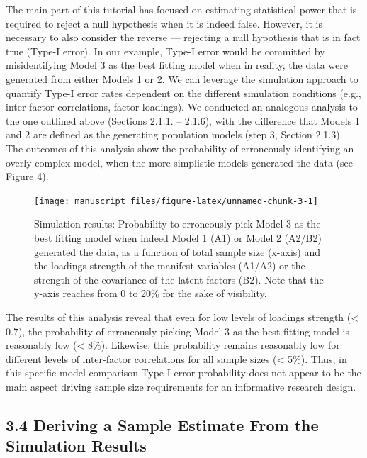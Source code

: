 \documentclass[
  man,floatsintext]{apa6}
\begin{document}
The main part of this tutorial has focused on estimating statistical power that is required to reject a null hypothesis when it is indeed false. However, it is necessary to also consider the reverse --- rejecting a null hypothesis that is in fact true (Type-I error). In our example, Type-I error would be committed by misidentifying Model 3 as the best fitting model when in reality, the data were generated from either Models 1 or 2. We can leverage the simulation approach to quantify Type-I error rates dependent on the different simulation conditions (e.g., inter-factor correlations, factor loadings). We conducted an analogous analysis to the one outlined above (Sections 2.1.1. -- 2.1.6), with the difference that Models 1 and 2 are defined as the generating population models (step 3, Section 2.1.3). The outcomes of this analysis show the probability of erroneously identifying an overly complex model, when the more simplistic models generated the data (see Figure 4).

\begin{figure}

{\centering \texttt{[image: manuscript\_files/figure-latex/unnamed-chunk-3-1]} 

}

\caption{Simulation results: Probability to erroneously pick Model 3 as the best fitting model when indeed Model 1 (A1) or Model 2 (A2/B2) generated the data, as a function of total sample size (x-axis) and the loadings strength of the manifest variables (A1/A2) or the strength of the covariance of the latent factors (B2). Note that the y-axis reaches from 0 to 20\% for the sake of visibility.}\label{fig:unnamed-chunk-3}
\end{figure}

The results of this analysis reveal that even for low levels of loadings strength (\textless{} 0.7), the probability of erroneously picking Model 3 as the best fitting model is reasonably low (\textless{} 8\%). Likewise, this probability remains reasonably low for different levels of inter-factor correlations for all sample sizes (\textless{} 5\%). Thus, in this specific model comparison Type-I error probability does not appear to be the main aspect driving sample size requirements for an informative research design.

\hypertarget{deriving-a-sample-estimate-from-the-simulation-results}{%
\subsection{3.4 Deriving a Sample Estimate From the Simulation Results}\label{deriving-a-sample-estimate-from-the-simulation-results}}
\end{document}
